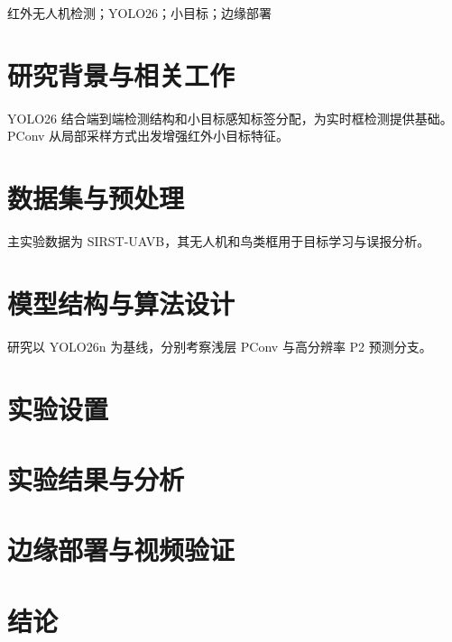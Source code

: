 \begin{abstract}
本文围绕红外小目标无人机检测组织研究内容，包括数据处理、YOLO26 模型设计、模块对照、检测评价和边缘部署。报告采用统一的数据划分与评价指标组织实验记录，分析浅层特征提取与高分辨率预测对检测效果和计算开销的影响。
\end{abstract}
\begin{IEEEkeywords}
红外无人机检测；YOLO26；小目标；边缘部署
\end{IEEEkeywords}

\section{研究背景与相关工作}
YOLO26 结合端到端检测结构和小目标感知标签分配，为实时框检测提供基础\cite{jocher2026yolo26,ultralytics2026docs}。PConv 从局部采样方式出发增强红外小目标特征\cite{yang2025pconv}。
\IEEEpubidadjcol

\section{数据集与预处理}
主实验数据为 SIRST-UAVB，其无人机和鸟类框用于目标学习与误报分析\cite{yang2025pconv}。

\section{模型结构与算法设计}
研究以 YOLO26n 为基线，分别考察浅层 PConv 与高分辨率 P2 预测分支。

\section{实验设置}

\section{实验结果与分析}

\section{边缘部署与视频验证}

\section{结论}

